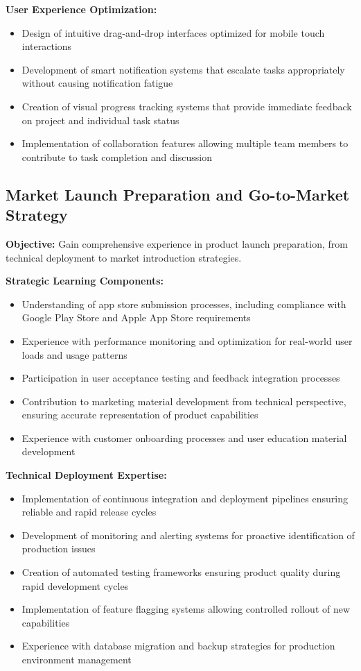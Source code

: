 \textbf{User Experience Optimization:}
\begin{itemize}
    \item Design of intuitive drag-and-drop interfaces optimized for mobile touch interactions
    \item Development of smart notification systems that escalate tasks appropriately without causing notification fatigue
    \item Creation of visual progress tracking systems that provide immediate feedback on project and individual task status
    \item Implementation of collaboration features allowing multiple team members to contribute to task completion and discussion
\end{itemize}

\subsection{Market Launch Preparation and Go-to-Market Strategy}

\textbf{Objective:} Gain comprehensive experience in product launch preparation, from technical deployment to market introduction strategies.

\textbf{Strategic Learning Components:}
\begin{itemize}
    \item Understanding of app store submission processes, including compliance with Google Play Store and Apple App Store requirements
    \item Experience with performance monitoring and optimization for real-world user loads and usage patterns
    \item Participation in user acceptance testing and feedback integration processes
    \item Contribution to marketing material development from technical perspective, ensuring accurate representation of product capabilities
    \item Experience with customer onboarding processes and user education material development
\end{itemize}

\textbf{Technical Deployment Expertise:}
\begin{itemize}
    \item Implementation of continuous integration and deployment pipelines ensuring reliable and rapid release cycles
    \item Development of monitoring and alerting systems for proactive identification of production issues
    \item Creation of automated testing frameworks ensuring product quality during rapid development cycles
    \item Implementation of feature flagging systems allowing controlled rollout of new capabilities
    \item Experience with database migration and backup strategies for production environment management
\end{itemize}

